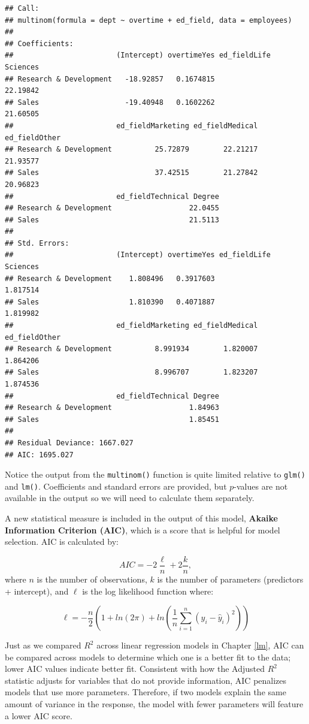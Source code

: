 \documentclass[
]{book}
\begin{document}
\begin{verbatim}
## Call:
## multinom(formula = dept ~ overtime + ed_field, data = employees)
## 
## Coefficients:
##                        (Intercept) overtimeYes ed_fieldLife Sciences
## Research & Development   -18.92857   0.1674815              22.19842
## Sales                    -19.40948   0.1602262              21.60505
##                        ed_fieldMarketing ed_fieldMedical ed_fieldOther
## Research & Development          25.72879        22.21217      21.93577
## Sales                           37.42515        21.27842      20.96823
##                        ed_fieldTechnical Degree
## Research & Development                  22.0455
## Sales                                   21.5113
## 
## Std. Errors:
##                        (Intercept) overtimeYes ed_fieldLife Sciences
## Research & Development    1.808496   0.3917603              1.817514
## Sales                     1.810390   0.4071887              1.819982
##                        ed_fieldMarketing ed_fieldMedical ed_fieldOther
## Research & Development          8.991934        1.820007      1.864206
## Sales                           8.996707        1.823207      1.874536
##                        ed_fieldTechnical Degree
## Research & Development                  1.84963
## Sales                                   1.85451
## 
## Residual Deviance: 1667.027 
## AIC: 1695.027
\end{verbatim}

Notice the output from the \texttt{multinom()} function is quite limited relative to \texttt{glm()} and \texttt{lm()}. Coefficients and standard errors are provided, but \(p\)-values are not available in the output so we will need to calculate them separately.

A new statistical measure is included in the output of this model, \textbf{Akaike Information Criterion (AIC)}, which is a score that is helpful for model selection. AIC is calculated by:

\[ AIC = -2\frac{\ell}{n} + 2\frac{k}{n}, \]
where \(n\) is the number of observations, \(k\) is the number of parameters (predictors + intercept), and \(\ell\) is the log likelihood function where:

\[ \ell = -\frac{n}{2}(1 + ln(2\pi) + ln(\frac{1}{n} \displaystyle\sum_{i=1}^{n}(y_i - \hat{y}_i)^2))  \]

Just as we compared \(R^2\) across linear regression models in Chapter \ref{lm}, AIC can be compared across models to determine which one is a better fit to the data; lower AIC values indicate better fit. Consistent with how the Adjusted \(R^2\) statistic adjusts for variables that do not provide information, AIC penalizes models that use more parameters. Therefore, if two models explain the same amount of variance in the response, the model with fewer parameters will feature a lower AIC score.
\end{document}
